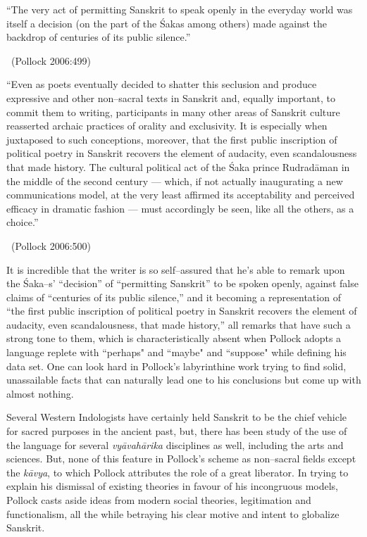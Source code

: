 \begin{myquote}
“The very act of permitting Sanskrit to speak openly in the everyday world was itself a decision (on the part of the Śakas among others) made against the backdrop of centuries of its public silence.” 

~\hfill (Pollock 2006:499)
\end{myquote}

\begin{myquote}
“Even as poets eventually decided to shatter this seclusion and produce expressive and other non–sacral texts in Sanskrit and, equally important, to commit them to writing, participants in many other areas of Sanskrit culture reasserted archaic practices of orality and exclusivity. It is especially when juxtaposed to such conceptions, moreover, that the first public inscription of political poetry in Sanskrit recovers the element of audacity, even scandalousness that made history. The cultural political act of the Śaka prince Rudradāman in the middle of the second century — which, if not actually inaugurating a new communications model, at the very least affirmed its acceptability and perceived efficacy in dramatic fashion — must accordingly be seen, like all the others, as a choice.” 

~\hfill (Pollock 2006:500)
\end{myquote}

It is incredible that the writer is so self–assured that he’s able to remark upon the Śaka–s' “decision” of “permitting Sanskrit” to be spoken openly, against false claims of “centuries of its public silence,” and it becoming a representation of “the first public inscription of political poetry in Sanskrit recovers the element of audacity, even scandalousness, that made history,” all remarks that have such a strong tone to them, which is characteristically absent when Pollock adopts a language replete with “perhaps" and “maybe" and “suppose" while defining his data set. One can look hard in Pollock’s labyrinthine work trying to find solid, unassailable facts that can naturally lead one to his conclusions but come up with almost nothing.

Several Western Indologists have certainly held Sanskrit to be the chief vehicle for sacred purposes in the ancient past, but, there has been study of the use of the language for several \textit{vyāvahārika} disciplines as well, including the arts and sciences. But, none of this feature in Pollock’s scheme as non–sacral fields except the \textit{kāvya}, to which Pollock attributes the role of a great liberator. In trying to explain his dismissal of existing theories in favour of his incongruous models, Pollock casts aside ideas from modern social theories, legitimation and functionalism, all the while betraying his clear motive and intent to globalize Sanskrit.

